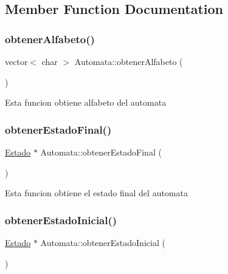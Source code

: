 \subsection{Member Function Documentation}
\mbox{\label{class_automata_af82a91d0826881327ee4b05723961c2f}} 
\subsubsection{\texorpdfstring{obtener\+Alfabeto()}{obtenerAlfabeto()}}
{\footnotesize\ttfamily vector$<$ char $>$ Automata\+::obtener\+Alfabeto (\begin{DoxyParamCaption}{ }\end{DoxyParamCaption})}

Esta funcion obtiene alfabeto del automata \mbox{\label{class_automata_a0aa43eed6361c006212719a97ffd920d}} 
\subsubsection{\texorpdfstring{obtener\+Estado\+Final()}{obtenerEstadoFinal()}}
{\footnotesize\ttfamily \hyperlink{class_estado}{Estado} $\ast$ Automata\+::obtener\+Estado\+Final (\begin{DoxyParamCaption}{ }\end{DoxyParamCaption})}

Esta funcion obtiene el estado final del automata \mbox{\label{class_automata_a00cdbcd4da13f79ce9b80935ca54eee7}} 
\subsubsection{\texorpdfstring{obtener\+Estado\+Inicial()}{obtenerEstadoInicial()}}
{\footnotesize\ttfamily \hyperlink{class_estado}{Estado} $\ast$ Automata\+::obtener\+Estado\+Inicial (\begin{DoxyParamCaption}{ }\end{DoxyParamCaption})}

